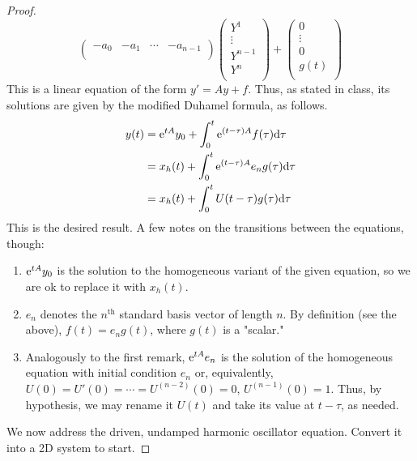 \documentclass[../psets.tex]{subfiles}
\begin{document}
\begin{enumerate}
\begin{proof}
\begin{equation*}
\begin{pmatrix}
                -a_0 & -a_1 & \cdots & -a_{n-1}\\
            \end{pmatrix}
            \begin{pmatrix}
                Y^1\\
                \vdots\\
                Y^{n-1}\\
                Y^n\\
            \end{pmatrix}
            +
            \begin{pmatrix}
                0\\
                \vdots\\
                0\\
                g(t)\\
            \end{pmatrix}
        \end{equation*}
        This is a linear equation of the form $y'=Ay+f$. Thus, as stated in class, its solutions are given by the modified Duhamel formula, as follows.
        \begin{align*}
            y(t) &= \e[tA]y_0+\int_0^t\e[(t-\tau)A]f(\tau)\dd\tau\\
            &= x_h(t)+\int_0^t\e[(t-\tau)A]e_ng(\tau)\dd\tau\\
            &= x_h(t)+\int_0^tU(t-\tau)g(\tau)\dd\tau
        \end{align*}
        This is the desired result. A few notes on the transitions between the equations, though:
        \begin{enumerate}[label={\arabic*.}]
            \item $\e[tA]y_0$ is the solution to the homogeneous variant of the given equation, so we are ok to replace it with $x_h(t)$.
            \item $e_n$ denotes the $n^\text{th}$ standard basis vector of length $n$. By definition (see the above), $f(t)=e_ng(t)$, where $g(t)$ is a "scalar."
            \item Analogously to the first remark, $\e[tA]e_n$ is the solution of the homogeneous equation with initial condition $e_n$ or, equivalently, $U(0)=U'(0)=\cdots=U^{(n-2)}(0)=0$, $U^{(n-1)}(0)=1$. Thus, by hypothesis, we may rename it $U(t)$ and take its value at $t-\tau$, as needed.
        \end{enumerate}
        We now address the driven, undamped harmonic oscillator equation. Convert it into a 2D system to start.

\end{proof}
\end{enumerate}
\end{document}
